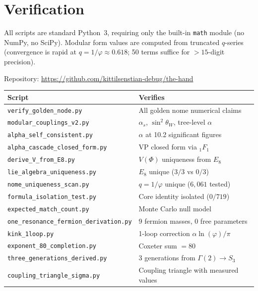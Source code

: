 \documentclass[11pt,a4paper]{article}
\newcommand{\vp}{\varphi}
\begin{document}
\section{Verification}
\label{sec:verification}

All scripts are standard Python~3, requiring only the built-in \texttt{math} module
(no NumPy, no SciPy).  Modular form values are computed from truncated $q$-series
(convergence is rapid at $q = 1/\vp \approx 0.618$; 50 terms suffice for
$>15$-digit precision).

\bigskip
\noindent
Repository: \url{https://github.com/kittilsenstian-debug/the-hand}

\begin{center}
\begin{tabular}{@{}ll@{}}
\toprule
Script & Verifies \\
\midrule
\texttt{verify\_golden\_node.py} & All golden nome numerical claims \\
\texttt{modular\_couplings\_v2.py} & $\alpha_s$, $\sin^2\!\theta_W$, tree-level $\alpha$ \\
\texttt{alpha\_self\_consistent.py} & $\alpha$ at 10.2 significant figures \\
\texttt{alpha\_cascade\_closed\_form.py} & VP closed form via ${}_1F_1$ \\
\texttt{derive\_V\_from\_E8.py} & $V(\Phi)$ uniqueness from $E_8$ \\
\texttt{lie\_algebra\_uniqueness.py} & $E_8$ unique ($3/3$ vs $0/3$) \\
\texttt{nome\_uniqueness\_scan.py} & $q = 1/\vp$ unique ($6{,}061$ tested) \\
\texttt{formula\_isolation\_test.py} & Core identity isolated ($0/719$) \\
\texttt{expected\_match\_count.py} & Monte Carlo null model \\
\texttt{one\_resonance\_fermion\_derivation.py}
  & 9 fermion masses, 0 free parameters \\
\texttt{kink\_1loop.py} & 1-loop correction $\alpha\ln(\vp)/\pi$ \\
\texttt{exponent\_80\_completion.py} & Coxeter sum $= 80$ \\
\texttt{three\_generations\_derived.py} & 3 generations from $\Gamma(2) \to S_3$ \\
\texttt{coupling\_triangle\_sigma.py} & Coupling triangle with measured values \\
\bottomrule
\end{tabular}
\end{center}
\end{document}
